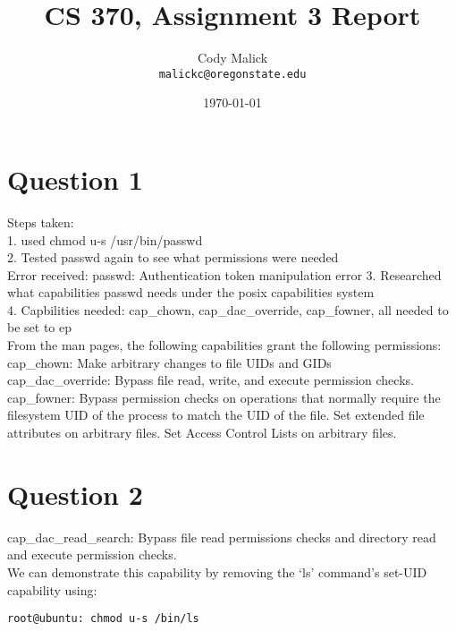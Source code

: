 \documentclass[10pt,letterpaper]{article}
\begin{document}
\title{CS 370, Assignment 3 Report}
\author{Cody Malick\\
\texttt{malickc@oregonstate.edu}}
\date{\today}
\maketitle

\section*{Question 1}
Steps taken:\\
1. used chmod u-s /usr/bin/passwd\\
2. Tested passwd again to see what permissions were needed\\
Error received: passwd: Authentication token manipulation error
3. Researched what capabilities passwd needs under the posix capabilities system\\
4. Capbilities needed: cap\_chown, cap\_dac\_override, cap\_fowner, all needed to be
set to ep\\

From the man pages, the following capabilities grant the following permissions:\\

cap\_chown: Make arbitrary changes to file UIDs and GIDs\\

cap\_dac\_override: Bypass file read, write, and execute permission checks.\\

cap\_fowner: Bypass permission checks on operations that normally require the
filesystem UID of the process to match the UID of the file. Set
extended file attributes on arbitrary files. Set Access Control Lists
on arbitrary files.

\section*{Question 2}

cap\_dac\_read\_search: Bypass file read permissions checks and directory read and
	execute permission checks.\\

We can demonstrate this capability by removing the `ls' command's set-UID capability
using:\\
\begin{lstlisting}[caption=Removing set-UID capability on ls]
root@ubuntu: chmod u-s /bin/ls
\end{lstlisting}
\end{document}
